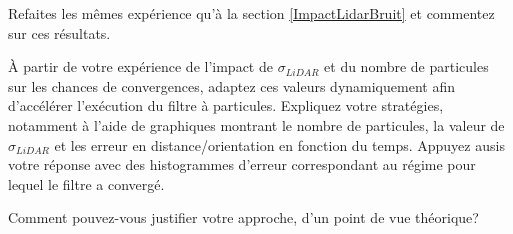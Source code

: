 \documentclass[12pt]{article}
\begin{document}
Refaites les mêmes expérience qu'à la section \ref{ImpactLidarBruit} et commentez sur ces résultats.

À partir de votre expérience de l'impact de $\sigma_{LiDAR}$ et du nombre de particules sur les chances de convergences, adaptez ces valeurs dynamiquement afin d'accélérer l'exécution du filtre à particules. Expliquez votre stratégies, notamment à l'aide de graphiques montrant le nombre de particules, la valeur de $\sigma_{LiDAR}$ et les erreur en distance/orientation en fonction du temps. Appuyez ausis votre réponse avec des histogrammes d'erreur correspondant au régime pour lequel le filtre a convergé.

Comment pouvez-vous justifier votre approche, d'un point de vue théorique?
\end{document}
